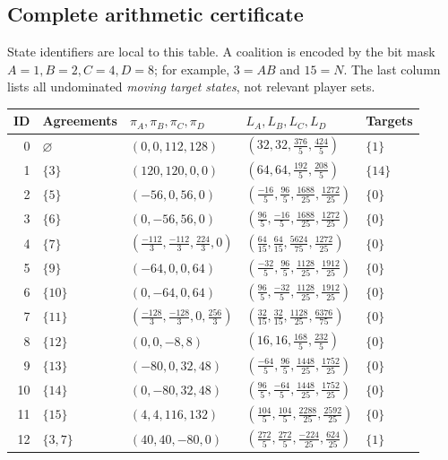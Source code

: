 \documentclass[11pt,a4paper]{article}
\theoremstyle{definition}\newtheorem{definition}[theorem]{Definition}
\theoremstyle{remark}\newtheorem{remark}[theorem]{Remark}
\newcommand{\1}{\mathbf 1}
\begin{document}
\subsection*{Complete arithmetic certificate}
State identifiers are local to this table. A coalition is encoded by the bit mask
$A=1,B=2,C=4,D=8$; for example, $3=AB$ and $15=N$.
The last column lists all undominated \emph{moving target states}, not relevant player sets.
\begingroup\footnotesize\renewcommand{\arraystretch}{1.45}
\setlength{\tabcolsep}{3pt}
\begin{longtable}{@{}r l l l l@{}}
\toprule ID & Agreements & $\pi_A,\pi_B,\pi_C,\pi_D$ & $L_A,L_B,L_C,L_D$ & Targets\\\midrule\endhead
0 & $\varnothing$ & $(0,0,112,128)$ & $(32,32,\frac{376}{5},\frac{424}{5})$ & $\{1\}$\\
1 & $\{3\}$ & $(120,120,0,0)$ & $(64,64,\frac{192}{5},\frac{208}{5})$ & $\{14\}$\\
2 & $\{5\}$ & $(-56,0,56,0)$ & $(\frac{-16}{5},\frac{96}{5},\frac{1688}{25},\frac{1272}{25})$ & $\{0\}$\\
3 & $\{6\}$ & $(0,-56,56,0)$ & $(\frac{96}{5},\frac{-16}{5},\frac{1688}{25},\frac{1272}{25})$ & $\{0\}$\\
4 & $\{7\}$ & $(\frac{-112}{3},\frac{-112}{3},\frac{224}{3},0)$ & $(\frac{64}{15},\frac{64}{15},\frac{5624}{75},\frac{1272}{25})$ & $\{0\}$\\
5 & $\{9\}$ & $(-64,0,0,64)$ & $(\frac{-32}{5},\frac{96}{5},\frac{1128}{25},\frac{1912}{25})$ & $\{0\}$\\
6 & $\{10\}$ & $(0,-64,0,64)$ & $(\frac{96}{5},\frac{-32}{5},\frac{1128}{25},\frac{1912}{25})$ & $\{0\}$\\
7 & $\{11\}$ & $(\frac{-128}{3},\frac{-128}{3},0,\frac{256}{3})$ & $(\frac{32}{15},\frac{32}{15},\frac{1128}{25},\frac{6376}{75})$ & $\{0\}$\\
8 & $\{12\}$ & $(0,0,-8,8)$ & $(16,16,\frac{168}{5},\frac{232}{5})$ & $\{0\}$\\
9 & $\{13\}$ & $(-80,0,32,48)$ & $(\frac{-64}{5},\frac{96}{5},\frac{1448}{25},\frac{1752}{25})$ & $\{0\}$\\
10 & $\{14\}$ & $(0,-80,32,48)$ & $(\frac{96}{5},\frac{-64}{5},\frac{1448}{25},\frac{1752}{25})$ & $\{0\}$\\
11 & $\{15\}$ & $(4,4,116,132)$ & $(\frac{104}{5},\frac{104}{5},\frac{2288}{25},\frac{2592}{25})$ & $\{0\}$\\
12 & $\{3,7\}$ & $(40,40,-80,0)$ & $(\frac{272}{5},\frac{272}{5},\frac{-224}{25},\frac{624}{25})$ & $\{1\}$\\

\end{longtable}
\end{document}
